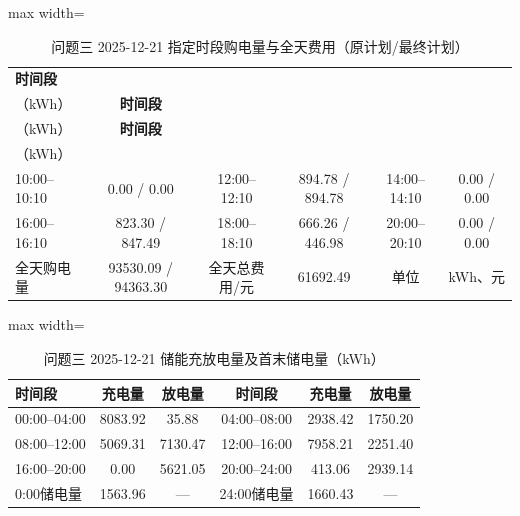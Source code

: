 \documentclass[UTF8,a4paper,zihao=-4,fontset=windows]{ctexart}
\begin{document}
\begin{table}[H]\centering
\fontsize{9.5}{12}\selectfont\setlength{\tabcolsep}{4pt}\renewcommand{\arraystretch}{1.12}
\begin{adjustbox}{max width=\linewidth}\begin{tabular}{lccccc}\toprule
\textbf{时间段} & \shortstack{\textbf{购电量}\\{\normalfont （kWh）}} & \textbf{时间段} & \shortstack{\textbf{购电量}\\{\normalfont （kWh）}} & \textbf{时间段} & \shortstack{\textbf{购电量}\\{\normalfont （kWh）}}\\\midrule
10:00–10:10 & 0.00 / 0.00 & 12:00–12:10 & 894.78 / 894.78 & 14:00–14:10 & 0.00 / 0.00\\
16:00–16:10 & 823.30 / 847.49 & 18:00–18:10 & 666.26 / 446.98 & 20:00–20:10 & 0.00 / 0.00\\
全天购电量 & 93530.09 / 94363.30 & 全天总费用/元 & 61692.49 & 单位 & kWh、元\\
\bottomrule\end{tabular}\end{adjustbox}
\caption{问题三 2025-12-21 指定时段购电量与全天费用（原计划/最终计划）}
\end{table}
\begin{table}[H]\centering
\fontsize{9.5}{12}\selectfont\setlength{\tabcolsep}{4pt}\renewcommand{\arraystretch}{1.12}
\begin{adjustbox}{max width=\linewidth}\begin{tabular}{lccccc}\toprule
\textbf{时间段} & \textbf{充电量} & \textbf{放电量} & \textbf{时间段} & \textbf{充电量} & \textbf{放电量}\\\midrule
00:00–04:00 & 8083.92 & 35.88 & 04:00–08:00 & 2938.42 & 1750.20\\
08:00–12:00 & 5069.31 & 7130.47 & 12:00–16:00 & 7958.21 & 2251.40\\
16:00–20:00 & 0.00 & 5621.05 & 20:00–24:00 & 413.06 & 2939.14\\
0:00储电量 & 1563.96 & — & 24:00储电量 & 1660.43 & —\\
\bottomrule\end{tabular}\end{adjustbox}
\caption{问题三 2025-12-21 储能充放电量及首末储电量（kWh）}
\end{table}
\end{document}
